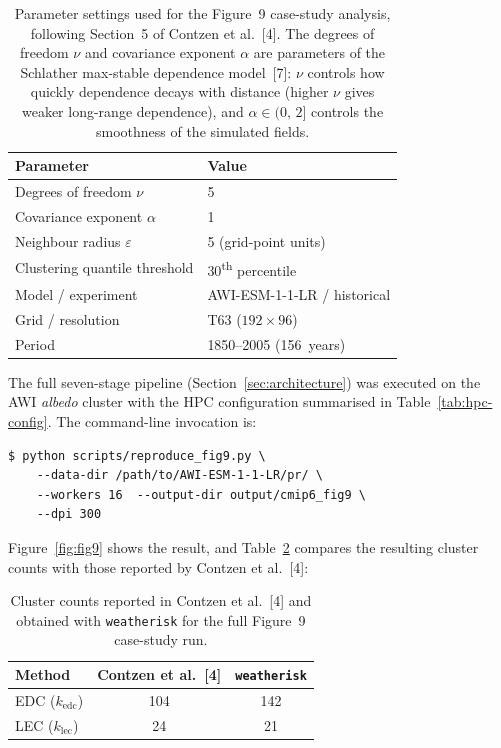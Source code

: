 \documentclass[preprint,12pt,a4paper]{elsarticle}
\newcommand{\rev}[1]{{#1}}
\newcommand{\revb}[1]{{\color{RevisionBlue}#1}}
\newcommand{\revo}[1]{{\color{RevisionOrange}#1}}
\begin{document}
\begin{table}[ht]
\centering
\begin{tabular}{ll}
\toprule
\textbf{Parameter} & \textbf{Value} \\
\midrule
Degrees of freedom $\nu$ & 5 \\
Covariance exponent $\alpha$ & 1 \\
Neighbour radius $\varepsilon$ & 5 (grid-point units) \\
Clustering quantile threshold & 30\textsuperscript{th} percentile \\
Model / experiment & AWI-ESM-1-1-LR / historical \\
Grid / resolution & T63 ($192 \times 96$) \\
Period & 1850--2005 (156~years) \\
\bottomrule
\end{tabular}
\caption{Parameter settings used for the Figure~9 \revb{case-study analysis},
  following Section~5 of Contzen et al.~[4]. \revo{The degrees of
  freedom $\nu$ and covariance exponent $\alpha$ are parameters of
  the Schlather max-stable dependence model~[7]: $\nu$ controls
  how quickly dependence decays with distance (higher $\nu$ gives
  weaker long-range dependence), and $\alpha \in (0,\,2]$
  controls the smoothness of the simulated fields.}}
\label{tab:fig9-params}
\end{table}

\rev{The full seven-stage pipeline (Section~\ref{sec:architecture}) was
executed on the AWI \emph{albedo} cluster with the HPC configuration
summarised in Table~\ref{tab:hpc-config}. The command-line invocation is:}

\begin{lstlisting}[caption={\revb{Running the Figure~9 case study on HPC}.},
  label=lst:fig9, numbers=none]
$ python scripts/reproduce_fig9.py \
    --data-dir /path/to/AWI-ESM-1-1-LR/pr/ \
    --workers 16  --output-dir output/cmip6_fig9 \
    --dpi 300
\end{lstlisting}

\rev{Figure~\ref{fig:fig9} shows the result, and
Table~\ref{tab:fig9-counts} compares the resulting cluster counts with
those reported by Contzen et al.~[4]:}

\begin{table}[ht]
\centering
\begin{tabular}{lcc}
\toprule
\textbf{Method} & \textbf{Contzen et al.~[4]} &
  \textbf{\texttt{weatherisk}} \\
\midrule
EDC ($k_{\text{edc}}$) & 104 & 142 \\
LEC ($k_{\text{lec}}$) & 24 & 21 \\
\bottomrule
\end{tabular}
\caption{Cluster counts reported in Contzen et al.~[4] and obtained
  with \texttt{weatherisk} for the full Figure~9 \revb{case-study run}.}
\label{tab:fig9-counts}
\end{table}
\end{document}
